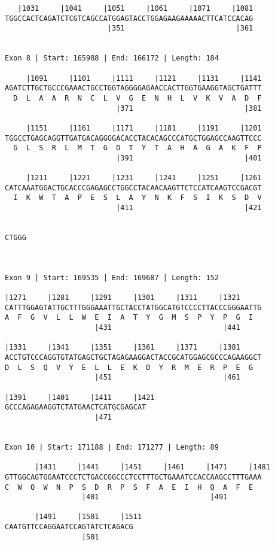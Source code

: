 \documentclass{article}
\begin{document}
\begin{Verbatim}
   |1031     |1041     |1051     |1061     |1071     |1081
TGGCCACTCAGATCTCGTCAGCCATGGAGTACCTGGAGAAGAAAAACTTCATCCACAG
                        |351                          |361
  
 
Exon 8 | Start: 165988 | End: 166172 | Length: 184
 
     |1091     |1101     |1111     |1121     |1131     |1141
AGATCTTGCTGCCCGAAACTGCCTGGTAGGGGAGAACCACTTGGTGAAGGTAGCTGATTT
  D  L  A  A  R  N  C  L  V  G  E  N  H  L  V  K  V  A  D  F
                          |371                          |381
  
     |1151     |1161     |1171     |1181     |1191     |1201
TGGCCTGAGCAGGTTGATGACAGGGGACACCTACACAGCCCATGCTGGAGCCAAGTTCCC
  G  L  S  R  L  M  T  G  D  T  Y  T  A  H  A  G  A  K  F  P
                          |391                          |401
  
     |1211     |1221     |1231     |1241     |1251     |1261
CATCAAATGGACTGCACCCGAGAGCCTGGCCTACAACAAGTTCTCCATCAAGTCCGACGT
  I  K  W  T  A  P  E  S  L  A  Y  N  K  F  S  I  K  S  D  V
                          |411                          |421
  
     
CTGGG
     
  
 
Exon 9 | Start: 169535 | End: 169687 | Length: 152
 
|1271     |1281     |1291     |1301     |1311     |1321     
CATTTGGAGTATTGCTTTGGGAAATTGCTACCTATGGCATGTCCCCTTACCCGGGAATTG
A  F  G  V  L  L  W  E  I  A  T  Y  G  M  S  P  Y  P  G  I  
                     |431                          |441     
  
|1331     |1341     |1351     |1361     |1371     |1381     
ACCTGTCCCAGGTGTATGAGCTGCTAGAGAAGGACTACCGCATGGAGCGCCCAGAAGGCT
D  L  S  Q  V  Y  E  L  L  E  K  D  Y  R  M  E  R  P  E  G  
                     |451                          |461     
  
|1391     |1401     |1411     |1421
GCCCAGAGAAGGTCTATGAACTCATGCGAGCAT
                     |471        
  
 
Exon 10 | Start: 171188 | End: 171277 | Length: 89
 
       |1431     |1441     |1451     |1461     |1471     |1481
GTTGGCAGTGGAATCCCTCTGACCGGCCCTCCTTTGCTGAAATCCACCAAGCCTTTGAAA
C  W  Q  W  N  P  S  D  R  P  S  F  A  E  I  H  Q  A  F  E  
                  |481                          |491        
  
       |1491     |1501     |1511
CAATGTTCCAGGAATCCAGTATCTCAGACG
                  |501        
  

\end{Verbatim}
\end{document}
